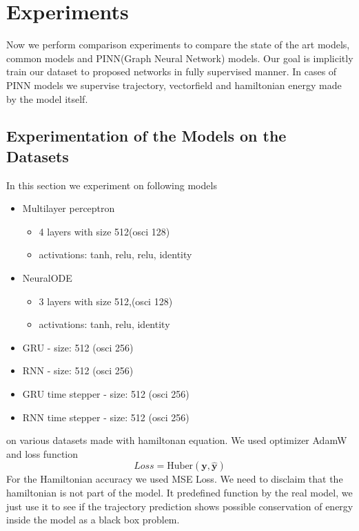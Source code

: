 \chapter{Experiments}
Now we perform comparison experiments to compare the state of the art models, common models and PINN(Graph Neural Network) models. Our goal is implicitly train our dataset to proposed networks in fully supervised manner. In cases of PINN models we supervise trajectory, vectorfield and hamiltonian energy made by the model itself. 

\section{Experimentation of the Models on the Datasets}
In this section we experiment on following models
\begin{itemize}
	\item Multilayer perceptron
	\begin{itemize}
		\item 4 layers with size 512(osci 128)
		\item activations: tanh, relu, relu, identity
	\end{itemize}
	
	\item NeuralODE
	\begin{itemize}
		\item 3 layers with size 512,(osci 128)
		\item activations: tanh, relu, identity
	\end{itemize}
	
	\item GRU - size: 512 (osci 256)
	\item RNN - size: 512 (osci 256)
	\item GRU time stepper - size: 512 (osci 256)
	\item RNN time stepper - size: 512 (osci 256)
\end{itemize}
on various datasets made with hamiltonan equation.
We used optimizer AdamW and loss function
\begin{equation}
	Loss = \text{Huber}(\mathbf{y},\hat{\mathbf{y}})
\end{equation}
For the Hamiltonian accuracy we used MSE Loss. We need to disclaim that the hamiltonian is not part of the model. It predefined function by the real model, we just use it to see if the trajectory prediction shows possible conservation of energy inside the model as a black box problem. 
